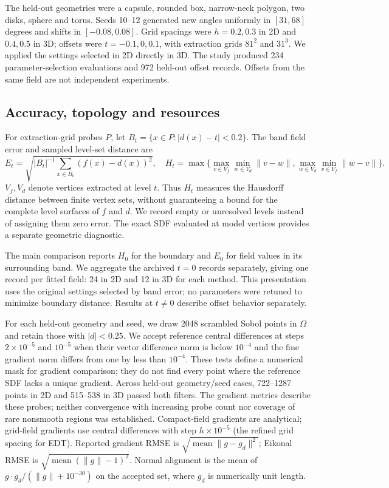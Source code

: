 \documentclass[12pt,letterpaper]{article}
\begin{document}
The held-out geometries were a capsule, rounded box, narrow-neck polygon, two disks, sphere and torus. Seeds 10--12 generated new angles uniformly in $[31,68]$ degrees and shifts in $[-0.08,0.08]$. Grid spacings were $h=0.2,0.3$ in 2D and $0.4,0.5$ in 3D; offsets were $t=-0.1,0,0.1$, with extraction grids $81^2$ and $31^3$. We applied the settings selected in 2D directly in 3D. The study produced 234 parameter-selection evaluations and 972 held-out offset records. Offsets from the same field are not independent experiments.

\subsection{Accuracy, topology and resources}
For extraction-grid probes $P$, let $B_t=\{x\in P:|d(x)-t|<0.2\}$. The band field error and sampled level-set distance are
\begin{equation}
  E_t=\sqrt{|B_t|^{-1}\sum_{x\in B_t}(f(x)-d(x))^2},\quad
  H_t=\max\{\max_{v\in V_f}\min_{w\in V_d}\|v-w\|,\max_{w\in V_d}\min_{v\in V_f}\|w-v\|\}.
\end{equation}
$V_f,V_d$ denote vertices extracted at level $t$. Thus $H_t$ measures the Hausdorff distance between finite vertex sets, without guaranteeing a bound for the complete level surfaces of $f$ and $d$. We record empty or unresolved levels instead of assigning them zero error. The exact SDF evaluated at model vertices provides a separate geometric diagnostic.

The main comparison reports $H_0$ for the boundary and $E_0$ for field values in its surrounding band. We aggregate the archived $t=0$ records separately, giving one record per fitted field: 24 in 2D and 12 in 3D for each method. This presentation uses the original settings selected by band error; no parameters were retuned to minimize boundary distance. Results at $t\ne0$ describe offset behavior separately.

For each held-out geometry and seed, we draw 2048 scrambled Sobol points in $\Omega$ and retain those with $|d|<0.25$. We accept reference central differences at steps $2\times10^{-5}$ and $10^{-5}$ when their vector difference norm is below $10^{-4}$ and the fine gradient norm differs from one by less than $10^{-4}$. These tests define a numerical mask for gradient comparison; they do not find every point where the reference SDF lacks a unique gradient. Across held-out geometry/seed cases, 722--1287 points in 2D and 515--538 in 3D passed both filters. The gradient metrics describe these probes; neither convergence with increasing probe count nor coverage of rare nonsmooth regions was established. Compact-field gradients are analytical; grid-field gradients use central differences with step $h\times10^{-5}$ (the refined grid spacing for EDT). Reported gradient RMSE is $\sqrt{\operatorname{mean}\|g-g_d\|^2}$; Eikonal RMSE is $\sqrt{\operatorname{mean}(\|g\|-1)^2}$. Normal alignment is the mean of $g\cdot g_d/(\|g\|+10^{-30})$ on the accepted set, where $g_d$ is numerically unit length.
\end{document}
